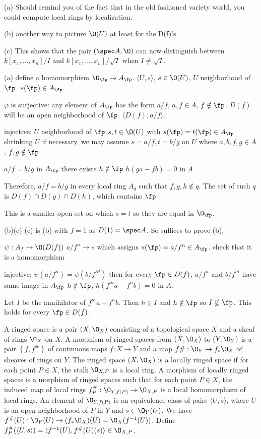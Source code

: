 \begin{rem}
(a) Should remind you of the fact that in the old fashioned variety world, you could compute local rings by localization. 

(b) another way to picture $\O(U)$ at least for the D(f)'s

(c) This shows that the pair $(\spec A, \O)$ can now distinguish between $k[x_1,\ldots,x_n]/I$ and $k[x_1,\ldots,x_n]/\sqrt{I}$ when $I \neq \sqrt{I}$. 
\end{rem}


\pf
(a) define a homomorphism $\O_\fp \to A_\fp$. 
$\langle U,s \rangle$, $s \in \O(U)$, $U$ neighborhood of $\fp$. 
$s(\fp) \in A_\fp$. 

$\varphi$ is surjective:
any element of $A_\fp$ has the form $a/f$, $a,f \in A$, $f \notin \fp$.
$D(f)$ will be an open neighborhood of $\fp$.
$\langle D(f), a/f \rangle$. 

injective: 
$U$ neighborhood of $\fp$
$s,t \in \O(U)$ with 
$s(\fp)= t(\fp) \in A_\fp$
shrinking $U$ if necessary, we may assume
$s= a/f, t= b/g$ on $U$
where $a,b,f,g \in A$, $f,g \notin \fp$

$a/f= b/g$ in $A_\fp$
there exists $h \notin \fp$
$h(ga-fb)=0$ in $A$

Therefore, $a/f= b/g$ in every local ring $A_q$
such that $f,g,h \notin q$.
The set of such $q$ is 
$D(f) \cap D(g) \cap D(h)$, which contains $\fp$

This is a smaller open set on which $s=t$
so they are equal in $\O_\fp$.

(b)(c)
(c) is (b) with $f=1$ as $D(1)= \spec A$. 
So suffices to prove (b).

$\psi: A_f \to \O(D(f))$
$a/f^n \to s$ which assigns $s(\fp)= a/f^n \in A_\fp$. 
check that it is a homomorphism

injective: $\psi(a/f^n)= \psi(b/f^M)$ then
for every $\fp \in D(f)$, $a/f^n$ and $b/f^m$
have same image in $A_\fp$
$h \notin \fp$, $h(f^ma - f^nb)= 0$ in $A$.

Let $I$ be the annihilator of $f^ma - f^nb$. Then $h \in I$ and $h \notin \fp$ so $I \not\subseteq \fp$. This holds for every $\fp \in D(f)$. 



\begin{dfn}
A ringed space is a pair $(X,\O_X)$ consisting of a topological space $X$ and a sheaf of rings $\O_X$ on $X$. A morphism of ringed spaces from $(X,\O_X)$ to $(Y,\O_Y)$ is a pair $(f,f^\#)$ of continuous maps $f: X \to Y$ and a map $f\#: \O_Y \to f_* \O_X$ of sheaves of rings on $Y$. The ringed space $(X,\O_X)$ is a locally ringed space if for each point $P \in X$, the stalk $\O_{X,P}$ is a local ring. A morphism of locally ringed spaces is a morphism of ringed spaces such that for each point $P \in X$, the induced map of local rings $f_P^\#: \O_{Y,f(P)} \to \O_{X,P}$ is a local homomorphism of local rings. An element of $\O_{Y,f(P)}$ is an equivalence class of pairs $\langle U, s \rangle$, where $U$ is an open neighborhood of $P$ in $Y$ and $s \in \O_Y(U)$.  We have $f^\#(U): \O_Y(U) \to (f_*\O_X)(U)= \O_X(f^{-1}(U))$. Define $f^\#_P( \langle U,s \rangle)= \langle f^{-1}(U), f^\#(U)(s) \rangle \in \O_{X,P}$. 
\end{dfn}


